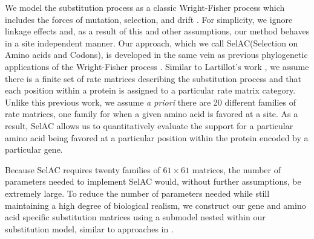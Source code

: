 \documentclass[12pt,letterpaper]{article}
\newcommand{\selac}{SelAC\xspace}
\begin{document}
We model the substitution process as a classic Wright-Fisher process which includes the forces of mutation, selection, and drift \citep{Fisher1930,Kimura1962,Wright1969,Iwasa1988,BergAndLassig2003,SellaAndHirsh2005,McCandlishAndStoltzfus2014}.
For simplicity, we ignore linkage effects and, as a result of this and other assumptions, our method behaves in a site independent manner.
Our approach, which we call \selac (Selection on Amino acids and Codons), is developed in the same vein as previous phylogenetic applications of the Wright-Fisher process \citep[e.g.][]{MuseAndGaut1994,HalpernAndBruno1998,YangAndNielsen2008,RodrigueEtAl2005,KoshiAndGoldstein1997,KoshiEtAl1999,DimmicEtAl2000,ThorneEtAl2012,LartillotAndPhilippe2004,RodrigueAndLartillot2014}.
Similar to Lartillot's work \citep{LartillotAndPhilippe2004,RodrigueAndLartillot2014}, we assume there is a finite set of rate matrices describing the substitution process and that each position within a protein is assigned to a particular rate matrix category.
Unlike this previous work, we assume \emph{a priori} there are 20 different families of rate matrices, one family for when a given amino acid is favored at a site.
As a result, \selac allows us to quantitatively evaluate the support for a particular amino acid being favored at a particular position within the protein encoded by a particular gene.

Because \selac requires twenty families of $61 \times 61$ matrices, the number of parameters needed to implement \selac would, without further assumptions, be extremely large.
To reduce the number of parameters needed while still maintaining a high degree of biological realism, we construct our gene and amino acid specific substitution matrices using a submodel nested within our substitution model, similar to approaches in \citet{Gilchrist2007,ShahAndGilchrist2011,GilchristEtAl2015}.
\end{document}
